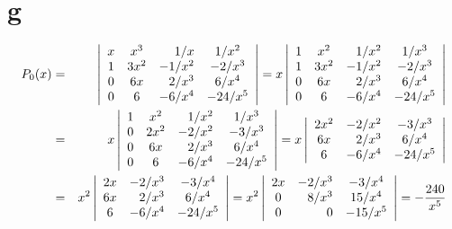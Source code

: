 \documentclass[dvips]{book}
\numberwithin{example}{section}
\numberwithin{equation}{section}
\numberwithin{theorem}{section}
\numberwithin{table}{section}
\numberwithin{figure}{section}
\begin{document}
\part{g}
\begin{eqnarray*}
P_0(x)&=&
\left|\begin{array}{ccrc}
x&x^3&1/x&1/x^2\\
1&3x^2&-1/x^2&-2/x^3\\
0&6x&2/x^3&6/x^4\\
0&6&-6/x^4&-24/x^5
\end{array}\right|=
x\left|\begin{array}{ccrc}
1&x^2&1/x^2&1/x^3\\
1&3x^2&-1/x^2&-2/x^3\\
0&6x&2/x^3&6/x^4\\
0&6&-6/x^4&-24/x^5
\end{array}\right|\\
&=&x\left|\begin{array}{ccrc}
1&x^2&1/x^2&1/x^3\\
0&2x^2&-2/x^2&-3/x^3\\
0&6x&2/x^3&6/x^4\\
0&6&-6/x^4&-24/x^5
\end{array}\right|=
x\left|\begin{array}{crc}
2x^2&-2/x^2&-3/x^3\\
6x&2/x^3&6/x^4\\
6&-6/x^4&-24/x^5
\end{array}\right|\\
&=&x^2\left|\begin{array}{crc}
2x&-2/x^3&-3/x^4\\
6x&2/x^3&6/x^4\\
6&-6/x^4&-24/x^5
\end{array}\right|
=x^2\left|\begin{array}{crc}
2x&-2/x^3&-3/x^4\\
0&8/x^3&15/x^4\\
0&0&-15/x^5
\end{array}\right|=-{240\over x^5}
\end{eqnarray*}
\end{document}
